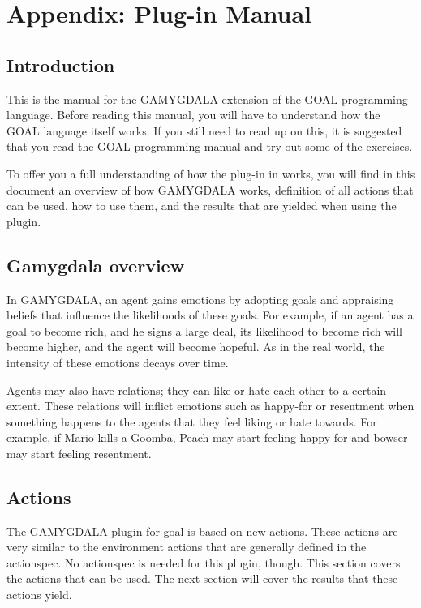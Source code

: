 \section{Appendix: Plug-in Manual}
\subsection{Introduction}
This is the manual for the GAMYGDALA extension of the GOAL programming language. Before reading this manual, you will have to understand how the GOAL language itself works. If you still need to read up on this, it is suggested that you read the GOAL programming manual and try out some of the exercises.

To offer you a full understanding of how the plug-in in works, you will find in this document an overview of how GAMYGDALA works, definition of all actions that can be used, how to use them, and the results that are yielded when using the plugin.

\subsection{Gamygdala overview}
In GAMYGDALA, an agent gains emotions by adopting goals and appraising beliefs that influence the likelihoods of these goals. For example, if an agent has a goal to become rich, and he signs a large deal, its likelihood to become rich will become higher, and the agent will become hopeful. As in the real world, the intensity of these emotions decays over time.

Agents may also have relations; they can like or hate each other to a certain extent. These relations will inflict emotions such as happy-for or resentment when something happens to the agents that they feel liking or hate towards. For example, if Mario kills a Goomba, Peach may start feeling happy-for and bowser may start feeling resentment.

\subsection{Actions}
The GAMYGDALA plugin for goal is based on new actions. These actions are very similar to the environment actions that are generally defined in the actionspec. No actionspec is needed for this plugin, though.
This section covers the actions that can be used. The next section will cover the results that these actions yield.


\clearpage





